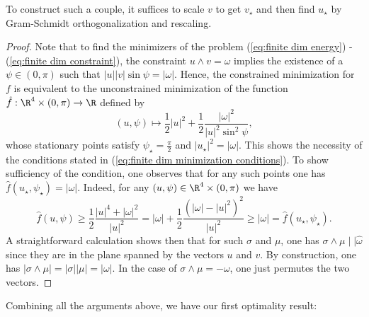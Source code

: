 \begin{remark}
To construct such a couple, it suffices to scale $v$ to get $v_\star$ and then find $u_\star$ by Gram-Schmidt orthogonalization and rescaling.
\end{remark}

\begin{proof}
Note that to find the minimizers of the problem (\ref{eq:finite dim energy}) - (\ref{eq:finite dim constraint}), the constraint $u \wedge v = \omega$ implies the existence of a $\psi \in (0, \pi)$ such that $|u||v| \sin \psi= |\omega|$. Hence, the constrained minimization for $f$ is equivalent to the unconstrained minimization of the function $\hat{f}: \R^4 \times (0, \pi) \to \R$ defined by
\begin{equation}
(u, \psi) \mapsto \frac{1}{2} |u|^2 + \frac{1}{2} \frac{|\omega|^2}{|u|^2 \sin^2\psi},
\end{equation}
whose stationary points satisfy $\psi_{\star} = \frac{\pi}{2}$ and $|u_{\star}|^2 = |\omega|$. This shows the necessity of the conditions stated in (\ref{eq:finite dim minimization conditions}). To show sufficiency of the condition, one observes that for any such points one has $\hat{f}(u_{\star}, \psi_{\star}) = |\omega|$. Indeed, for any $(u, \psi)  \in \R^4 \times (0, \pi)$ we have
\begin{equation}
\hat{f}(u, \psi) \geq \frac{1}{2} \frac{|u|^4 + |\omega|^2}{|u|^2} = |\omega| + \frac{1}{2}\frac{(|\omega| - |u|^2)^2}{|u|^2} \geq |\omega| = \hat{f}(u_{\star}, \psi_{\star}).
\end{equation}
A straightforward calculation shows then that for such $\sigma$ and $\mu$, one has $\sigma \wedge \mu \mid \mid \hat{\omega}$ since they are in the plane spanned by the vectors $u$ and $v$. By construction, one has $|\sigma \wedge \mu| = |\sigma| |\mu| = |\omega|$. In the case of $\sigma \wedge \mu = - \omega$, one just permutes the two vectors.
\end{proof}

Combining all the arguments above, we have our first optimality result:

